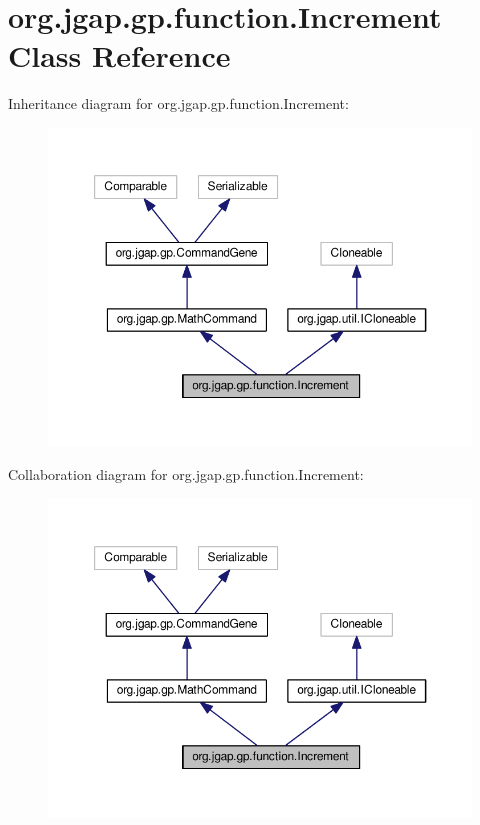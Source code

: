 \hypertarget{classorg_1_1jgap_1_1gp_1_1function_1_1_increment}{\section{org.\-jgap.\-gp.\-function.\-Increment Class Reference}
\label{classorg_1_1jgap_1_1gp_1_1function_1_1_increment}
}


Inheritance diagram for org.\-jgap.\-gp.\-function.\-Increment\-:
\nopagebreak
\begin{figure}[H]
\begin{center}
\leavevmode
\includegraphics[width=350pt]{classorg_1_1jgap_1_1gp_1_1function_1_1_increment__inherit__graph}
\end{center}
\end{figure}


Collaboration diagram for org.\-jgap.\-gp.\-function.\-Increment\-:
\nopagebreak
\begin{figure}[H]
\begin{center}
\leavevmode
\includegraphics[width=350pt]{classorg_1_1jgap_1_1gp_1_1function_1_1_increment__coll__graph}
\end{center}
\end{figure}
